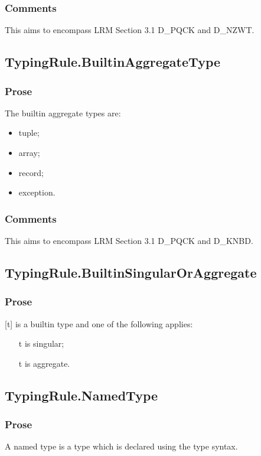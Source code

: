 \documentclass{book}
\begin{document}
    \subsubsection{Comments}
    This aims to encompass LRM Section 3.1 D\_PQCK and D\_NZWT.

\subsection{TypingRule.BuiltinAggregateType \label{sec:TypingRule.BuiltinAggregateType}}

    \subsubsection{Prose}
    The builtin aggregate types are:
    \begin{itemize}
    \item  tuple;
    \item  array;
    \item  record;
    \item  exception.
    \end{itemize}

    \subsubsection{Comments}
    This aims to encompass LRM Section 3.1 D\_PQCK and D\_KNBD.

\subsection{TypingRule.BuiltinSingularOrAggregate}

    \subsubsection{Prose}
    [t] is a builtin type and one of the following applies:
    \begin{itemize}
    \item  [t] is singular;
    \item  [t] is aggregate.
    \end{itemize}

\subsection{TypingRule.NamedType} 

    \subsubsection{Prose}
    A named type is a type which is declared using the type syntax.
\end{document}
